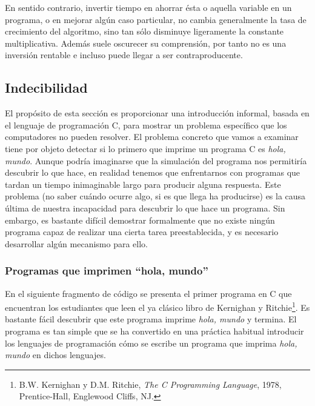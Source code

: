 En sentido contrario, invertir tiempo en ahorrar ésta o aquella variable en un programa, o en mejorar algún caso particular, no cambia generalmente la tasa de crecimiento del algoritmo, sino tan sólo disminuye ligeramente la constante multiplicativa. Además suele oscurecer su comprensión, por tanto no es una inversión rentable e incluso puede llegar a ser contraproducente. \\

\subsection{Indecibilidad}
\label{sec:indecibilidad}

El propósito de esta sección es proporcionar una introducción informal, basada en el lenguaje de programación C, para mostrar un problema específico que los computadores no pueden resolver. El problema concreto que vamos a examinar tiene por objeto detectar si lo primero que imprime un programa C es \emph{hola, mundo}. Aunque podría imaginarse que la simulación del programa nos permitiría descubrir lo que hace, en realidad tenemos que enfrentarnos con programas que tardan un tiempo inimaginable largo para producir alguna respuesta. Este problema (no saber cuándo ocurre algo, si es que llega ha producirse) es la causa última de nuestra incapacidad para descubrir lo que hace un programa. Sin embargo, es bastante difícil demostrar formalmente que no existe ningún programa capaz de realizar una cierta tarea preestablecida, y es necesario desarrollar algún mecanismo para ello. \\

\newpage

\subsubsection{Programas que imprimen ``hola, mundo''}

En el siguiente fragmento de código se presenta el primer programa en C que encuentran los estudiantes que leen el ya clásico libro de Kernighan y Ritchie\footnote{B.W. Kernighan y D.M. Ritchie, \emph{The C Programming Language}, 1978, Prentice-Hall, Englewood Cliffs, NJ.}. Es bastante fácil descubrir que este programa imprime \emph{hola, mundo} y termina. El programa es tan simple que se ha convertido en una práctica habitual introducir los lenguajes de programación cómo se escribe un programa que imprima \emph{hola, mundo} en dichos lenguajes. \\

